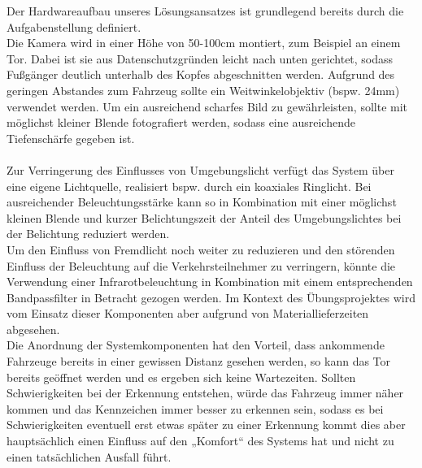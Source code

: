 \documentclass{../Vorlage/sebDenCls}
\begin{document}
Der Hardwareaufbau unseres Lösungsansatzes ist grundlegend bereits durch die Aufgabenstellung definiert.\\
Die Kamera wird in einer Höhe von 50-100cm montiert, zum Beispiel an einem Tor. Dabei ist sie aus Datenschutzgründen leicht nach unten gerichtet, sodass Fußgänger deutlich unterhalb des Kopfes abgeschnitten werden. Aufgrund des geringen Abstandes zum Fahrzeug sollte ein Weitwinkelobjektiv (bspw. 24mm) verwendet werden. Um ein ausreichend scharfes Bild zu gewährleisten, sollte mit möglichst kleiner Blende fotografiert werden, sodass eine ausreichende Tiefenschärfe gegeben ist. \\
\\
Zur Verringerung des Einflusses von Umgebungslicht verfügt das System über eine eigene Lichtquelle, realisiert bspw. durch ein koaxiales Ringlicht. Bei ausreichender Beleuchtungsstärke kann so in Kombination mit einer möglichst kleinen Blende und kurzer Belichtungszeit der Anteil des Umgebungslichtes bei der Belichtung reduziert werden.\\
Um den Einfluss von Fremdlicht noch weiter zu reduzieren und den störenden Einfluss der Beleuchtung auf die Verkehrsteilnehmer zu verringern, könnte die Verwendung einer Infrarotbeleuchtung in Kombination mit einem entsprechenden Bandpassfilter in Betracht gezogen werden. Im Kontext des Übungsprojektes wird vom Einsatz dieser Komponenten aber aufgrund von Materiallieferzeiten abgesehen.
\\
Die Anordnung der Systemkomponenten hat den Vorteil, dass ankommende Fahrzeuge bereits in einer gewissen Distanz gesehen werden, so kann das Tor bereits geöffnet werden und es ergeben sich keine Wartezeiten. Sollten Schwierigkeiten bei der Erkennung entstehen, würde das Fahrzeug immer näher kommen und das Kennzeichen immer besser zu erkennen sein, sodass es bei Schwierigkeiten eventuell erst etwas später zu einer Erkennung kommt dies aber hauptsächlich einen Einfluss auf den „Komfort“ des Systems hat und nicht zu einen tatsächlichen Ausfall führt.
\end{document}
